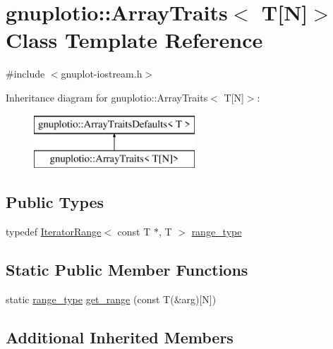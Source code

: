 \hypertarget{classgnuplotio_1_1_array_traits_3_01_t[_n]_4}{}\section{gnuplotio\+:\+:Array\+Traits$<$ T\mbox{[}N\mbox{]}$>$ Class Template Reference}
\label{classgnuplotio_1_1_array_traits_3_01_t[_n]_4}


{\ttfamily \#include $<$gnuplot-\/iostream.\+h$>$}

Inheritance diagram for gnuplotio\+:\+:Array\+Traits$<$ T\mbox{[}N\mbox{]}$>$\+:\begin{figure}[H]
\begin{center}
\leavevmode
\includegraphics[height=2.000000cm]{classgnuplotio_1_1_array_traits_3_01_t[_n]_4}
\end{center}
\end{figure}
\subsection*{Public Types}
\begin{DoxyCompactItemize}
\item 
typedef \hyperlink{classgnuplotio_1_1_iterator_range}{Iterator\+Range}$<$ const T $\ast$, T $>$ \hyperlink{classgnuplotio_1_1_array_traits_3_01_t[_n]_4_a926f3c3d14fbe82aab7b70ccc16d20fb}{range\+\_\+type}
\end{DoxyCompactItemize}
\subsection*{Static Public Member Functions}
\begin{DoxyCompactItemize}
\item 
static \hyperlink{classgnuplotio_1_1_array_traits_3_01_t[_n]_4_a926f3c3d14fbe82aab7b70ccc16d20fb}{range\+\_\+type} \hyperlink{classgnuplotio_1_1_array_traits_3_01_t[_n]_4_adc9c1ce6da4923418f367e08c150a928}{get\+\_\+range} (const T(\&arg)\mbox{[}N\mbox{]})
\end{DoxyCompactItemize}
\subsection*{Additional Inherited Members}


